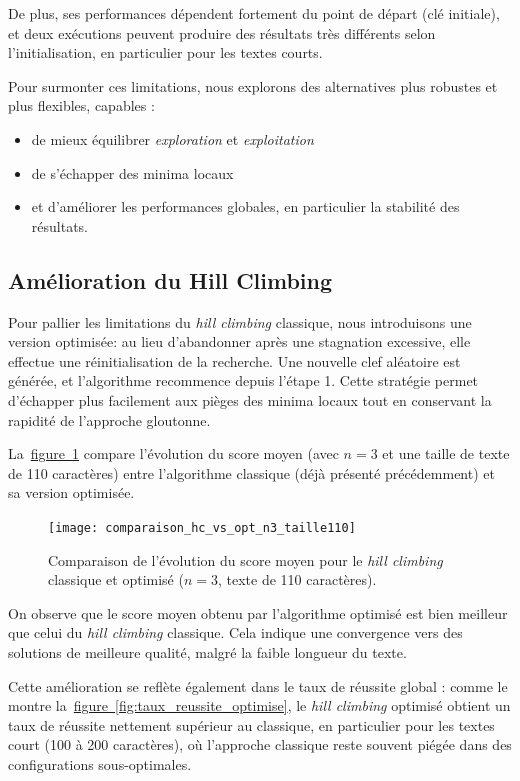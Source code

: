 \documentclass[a4paper]{article}
\newcommand{\figref}[1]{\hyperref[#1]{figure~\ref*{#1}}}
\begin{document}
De plus, ses performances dépendent fortement du point de départ (clé initiale), et deux exécutions peuvent produire des résultats très différents selon l’initialisation, en particulier pour les textes courts.

Pour surmonter ces limitations, nous explorons des alternatives plus robustes et plus flexibles, capables :
\begin{itemize}
    \item de mieux équilibrer \textit{exploration} et \textit{exploitation}
    \item de s’échapper des minima locaux
    \item et d’améliorer les performances globales, en particulier la stabilité des résultats.
\end{itemize}


\subsection{Amélioration du Hill Climbing}

Pour pallier les limitations du \textit{hill climbing} classique, nous introduisons une version optimisée: au lieu d’abandonner après une
stagnation excessive, elle effectue une réinitialisation de la recherche. Une nouvelle clef aléatoire est
générée, et l’algorithme recommence depuis l’étape 1. Cette stratégie permet d’échapper plus facilement aux pièges des minima locaux tout en conservant la rapidité de l’approche gloutonne.

La~\figref{fig:hc_optimise_score} compare l’évolution du score moyen (avec $n=3$ et une taille de texte de 110 caractères) entre l’algorithme classique (déjà présenté précédemment) et sa version optimisée.

\begin{figure}[H]
\centering
\texttt{[image: comparaison\_hc\_vs\_opt\_n3\_taille110]}
\caption{Comparaison de l’évolution du score moyen pour le \textit{hill climbing} classique et optimisé ($n=3$, texte de 110 caractères).}
\label{fig:hc_optimise_score}
\end{figure}

On observe que le score moyen obtenu par l’algorithme optimisé est bien meilleur que celui du \textit{hill climbing} classique. Cela indique une convergence vers des solutions de meilleure qualité, malgré la faible longueur du texte.

Cette amélioration se reflète également dans le taux de réussite global : comme le montre la~\figref{fig:taux_reussite_optimise}, le \textit{hill climbing} optimisé obtient un taux de réussite nettement supérieur au classique, en particulier pour les textes court (100 à 200 caractères), où l’approche classique reste souvent piégée dans des configurations sous-optimales.
\end{document}
